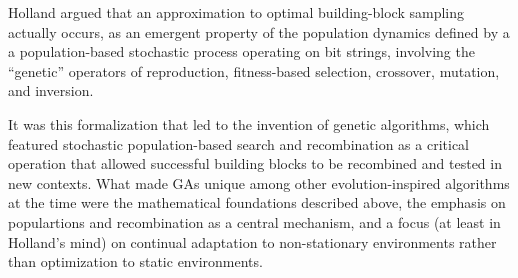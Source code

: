 \documentclass{sig-alternate}
\begin{document}

Holland argued that an approximation to
optimal building-block sampling actually occurs, as an emergent
property of the population dynamics defined by a
a population-based stochastic process
operating on bit strings, involving the ``genetic'' operators of
 reproduction, fitness-based selection, crossover, mutation, and
 inversion.  


It was this formalization
that led to the invention of genetic algorithms, which featured stochastic
population-based search and recombination as a critical
operation that allowed successful building blocks to be recombined and
tested in new contexts.  What made GAs unique
among other evolution-inspired algorithms at the time were the
mathematical foundations described above, the emphasis on populartions
and recombination as a central mechanism,
and a focus (at least in Holland's mind) on continual adaptation to
non-stationary environments rather than optimization to static
environments.
\end{document}
